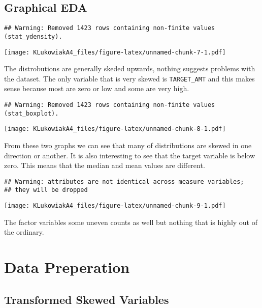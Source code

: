 \documentclass[]{article}
\begin{document}
\hypertarget{graphical-eda}{%
\subsection{Graphical EDA}\label{graphical-eda}}

\begin{verbatim}
## Warning: Removed 1423 rows containing non-finite values (stat_ydensity).
\end{verbatim}

\texttt{[image: KLukowiakA4\_files/figure-latex/unnamed-chunk-7-1.pdf]}

The distrobutions are generally skeded upwards, nothing suggests
problems with the dataset. The only variable that is very skewed is
\texttt{TARGET\_AMT} and this makes sense because most are zero or low
and some are very high.

\begin{verbatim}
## Warning: Removed 1423 rows containing non-finite values (stat_boxplot).
\end{verbatim}

\texttt{[image: KLukowiakA4\_files/figure-latex/unnamed-chunk-8-1.pdf]}

From these two graphs we can see that many of distributions are skewed
in one direction or another. It is also interesting to see that the
target variable is below zero. This means that the median and mean
values are different.

\begin{verbatim}
## Warning: attributes are not identical across measure variables;
## they will be dropped
\end{verbatim}

\texttt{[image: KLukowiakA4\_files/figure-latex/unnamed-chunk-9-1.pdf]}

The factor variables some uneven counts as well but nothing that is
highly out of the ordinary.

\hypertarget{data-preperation}{%
\section{Data Preperation}\label{data-preperation}}

\hypertarget{transformed-skewed-variables}{%
\subsection{Transformed Skewed
Variables}\label{transformed-skewed-variables}}
\end{document}
